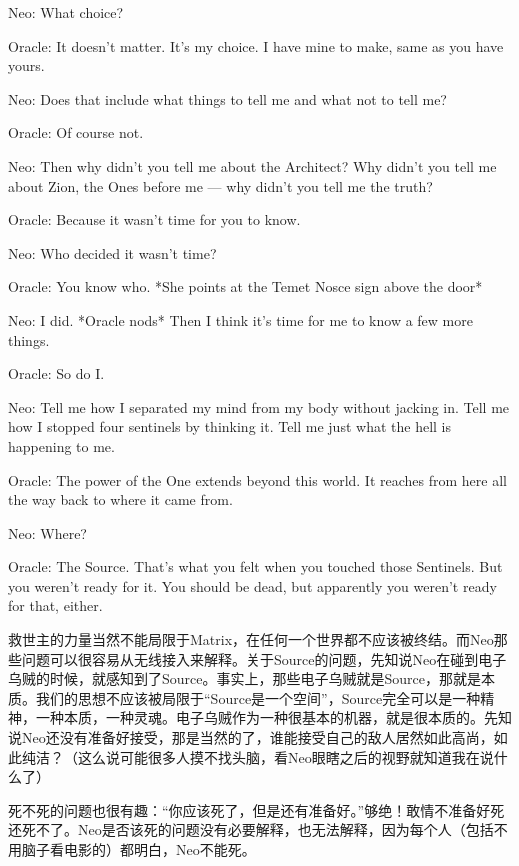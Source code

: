 \documentclass[UTF8]{ctexart}
\newenvironment{myquote}{\color{green} \setlength{\leftskip}{6em} \setlength{\rightskip}{4em} \setlength{\parindent}{-2em}}{\par}
\begin{document}
\begin{myquote}
Neo: What choice?

Oracle: It doesn't matter. It's my choice. I have mine to make, same as you have yours.

Neo: Does that include what things to tell me and what not to tell me?

Oracle: Of course not.

Neo: Then why didn't you tell me about the Architect? Why didn't you tell me about Zion, the Ones before me --- why didn't you tell me the truth?

Oracle: Because it wasn't time for you to know.

Neo: Who decided it wasn't time?

Oracle: You know who. *She points at the Temet Nosce sign above the door*

Neo: I did. *Oracle nods* Then I think it's time for me to know a few more things.

Oracle: So do I.

Neo: Tell me how I separated my mind from my body without jacking in. Tell me how I stopped four sentinels by thinking it. Tell me just what the hell is happening to me.

Oracle: The power of the One extends beyond this world. It reaches from here all the way back to where it came from.

Neo: Where?

Oracle: The Source. That's what you felt when you touched those Sentinels. But you weren't ready for it. You should be dead, but apparently you weren't ready for that, either.
\end{myquote}

救世主的力量当然不能局限于Matrix，在任何一个世界都不应该被终结。而Neo那些问题可以很容易从无线接入来解释。关于Source的问题，先知说Neo在碰到电子乌贼的时候，就感知到了Source。事实上，那些电子乌贼就是Source，那就是本质。我们的思想不应该被局限于“Source是一个空间”，Source完全可以是一种精神，一种本质，一种灵魂。电子乌贼作为一种很基本的机器，就是很本质的。先知说Neo还没有准备好接受，那是当然的了，谁能接受自己的敌人居然如此高尚，如此纯洁？（这么说可能很多人摸不找头脑，看Neo眼瞎之后的视野就知道我在说什么了）

死不死的问题也很有趣：“你应该死了，但是还有准备好。”够绝！敢情不准备好死还死不了。Neo是否该死的问题没有必要解释，也无法解释，因为每个人（包括不用脑子看电影的）都明白，Neo不能死。
\end{document}
